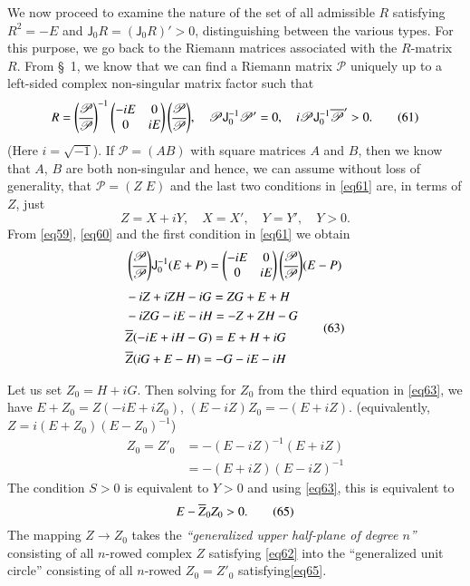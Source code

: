 We now proceed to examine the nature of the set of all admissible $R$
satisfying $R^{2}=-E$ and $\mathsf{J}_{0}R=(\mathsf{J}_{0}R)'>0$,
distinguishing between the various types. For this purpose, we go back
to the Riemann matrices associated with the $R$-matrix $R$. From
\S\ 1, we know that we can find a Riemann matrix
$\mathscr{P}$ uniquely up to a left-sided complex non-singular matrix
factor such that 
\begin{equation*}
R=\binom{\mathscr{P}}{\overline{\mathscr{P}}}^{-1}
\begin{pmatrix}
-iE & 0\\
0 & iE
\end{pmatrix}
\binom{\mathscr{P}}{\overline{\mathscr{P}}},\quad
\mathscr{P}\mathsf{J}^{-1}_{0}\mathscr{P}'=0,\quad
i\mathscr{P}\mathsf{J}^{-1}_{0}\overline{\mathscr{P}}'>0.\tag{61}\label{eq61} 
\end{equation*}\pageoriginale
(Here $i=\sqrt{-1}$). If $\mathscr{P}=(AB)$ with square matrices $A$
and $B$, then we know that $A$, $B$ are both non-singular and hence,
we can assume without loss of generality, that $\mathscr{P}=(Z \; E)$ and
the last two conditions in \eqref{eq61} are, in terms of $Z$, just
\begin{equation*}
Z=X+iY,\quad X=X',\quad Y=Y',\quad Y>0.\tag{62}\label{eq62}
\end{equation*}
From \eqref{eq59}, \eqref{eq60} and the first condition in \eqref{eq61} we
obtain
$$
\binom{\mathscr{P}}{\overline{\mathscr{P}}}\mathsf{J}^{-1}_{0}(E+P)=
\begin{pmatrix}
-iE & 0\\
0 & iE
\end{pmatrix}
\binom{\mathscr{P}}{\overline{\mathscr{P}}}(E-P)
$$
\ie
\begin{equation*}
\begin{split}
& -iZ+iZH -iG=ZG+E+H\\
& -iZG-iE-iH=-Z+ZH-G\\
& \overline{Z}(-iE+iH-G)=E+H+iG\\
& \overline{Z}(iG+E-H)=-G-iE-iH
\end{split}\tag{63}\label{eq63}
\end{equation*}

Let us set $Z_{0}=H+iG$. Then solving for $Z_{0}$ from the third
equation in \eqref{eq63}, we have $E+Z_{0}=Z(-iE+iZ_{0})$, \ie
$(E-iZ)Z_{0}=-(E+iZ)$. (equivalently, $Z=i(E+Z_{0})(E-Z_{0})^{-1}$)
\begin{align*}
Z_{0}=Z'_{0} &= -(E-iZ)^{-1}(E+iZ)\\
            &= -(E+iZ)(E-iZ)^{-1}\tag{64}\label{eq64}
\end{align*}
The condition $S>0$ is equivalent to $Y>0$ and using \eqref{eq63}, this
is equivalent to
\begin{equation*}
E-\overline{Z}_{0}Z_{0}>0.\tag{65}\label{eq65}
\end{equation*}
The mapping $Z\to Z_{0}$ takes the {\em ``generalized upper half-plane
  of degree $n$''} consisting of all $n$-rowed complex $Z$ satisfying
\eqref{eq62} into the ``generalized unit circle'' consisting of all
$n$-rowed $Z_{0}=Z'_{0}$ satisfying\pageoriginale \eqref{eq65}.

